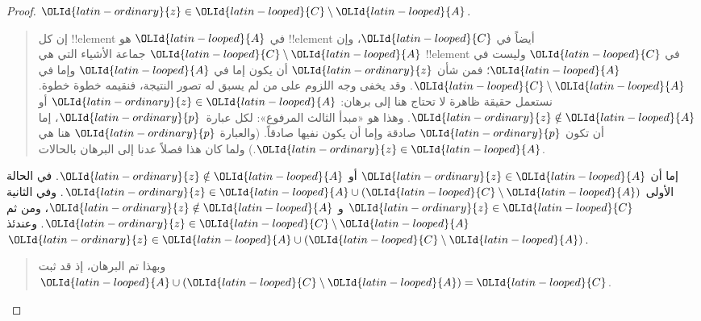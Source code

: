 \documentclass[../../../include/open-logic-section]{subfiles}
\begin{document}
\begin{proof}
  $\OLId{latin-ordinary}{z} \in \OLId{latin-looped}{C} \setminus \OLId{latin-looped}{A}$.
  \begin{quote}
    إن كل !!{element} في $\OLId{latin-looped}{A}$ هو !!{element} أيضاً في $\OLId{latin-looped}{C}$، وإن
    $\OLId{latin-looped}{C} \setminus \OLId{latin-looped}{A}$ جماعة الأشياء التي هي !!{element} في $\OLId{latin-looped}{C}$ وليست
    في $\OLId{latin-looped}{A}$؛ فمن شأن $\OLId{latin-ordinary}{z}$ أن يكون إما في $\OLId{latin-looped}{A}$ وإما في
    $\OLId{latin-looped}{C} \setminus \OLId{latin-looped}{A}$. وقد يخفى وجه اللزوم على من لم يسبق له تصور
    النتيجة، فنقيمه خطوة خطوة. نستعمل حقيقة ظاهرة لا تحتاج هنا إلى
    برهان: $\OLId{latin-ordinary}{z} \in \OLId{latin-looped}{A}$ أو $\OLId{latin-ordinary}{z} \notin \OLId{latin-looped}{A}$. وهذا هو «مبدأ الثالث المرفوع»:
    لكل عبارة~$\OLId{latin-ordinary}{p}$، إما أن تكون $\OLId{latin-ordinary}{p}$ صادقة وإما أن يكون نفيها صادقاً.
    (والعبارة $\OLId{latin-ordinary}{p}$ هنا هي $\OLId{latin-ordinary}{z} \in \OLId{latin-looped}{A}$.) ولما كان هذا فصلاً عدنا إلى
    البرهان بالحالات.
  \end{quote}
  إما أن $\OLId{latin-ordinary}{z} \in \OLId{latin-looped}{A}$ أو $\OLId{latin-ordinary}{z} \notin \OLId{latin-looped}{A}$. في الحالة الأولى
  $\OLId{latin-ordinary}{z} \in \OLId{latin-looped}{A} \cup (\OLId{latin-looped}{C} \setminus \OLId{latin-looped}{A})$. وفي الثانية $\OLId{latin-ordinary}{z} \in \OLId{latin-looped}{C}$ و
  $\OLId{latin-ordinary}{z} \notin \OLId{latin-looped}{A}$، ومن ثم $\OLId{latin-ordinary}{z} \in \OLId{latin-looped}{C} \setminus \OLId{latin-looped}{A}$. وعندئذ
  $\OLId{latin-ordinary}{z} \in \OLId{latin-looped}{A} \cup (\OLId{latin-looped}{C} \setminus \OLId{latin-looped}{A})$.
  \begin{quote}
    وبهذا تم البرهان، إذ قد ثبت $\OLId{latin-looped}{A} \cup (\OLId{latin-looped}{C} \setminus \OLId{latin-looped}{A}) = \OLId{latin-looped}{C}$.
  \end{quote}
\end{proof}
\end{document}
